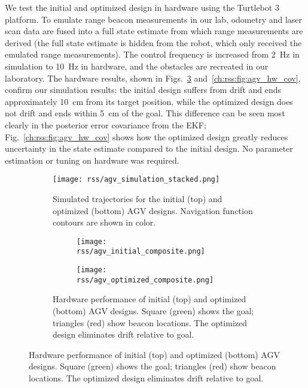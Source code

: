 We test the initial and optimized design in hardware using the Turtlebot 3 platform. To emulate range beacon measurements in our lab, odometry and laser scan data are fused into a full state estimate from which range measurements are derived (the full state estimate is hidden from the robot, which only received the emulated range measurements). The control frequency is increased from \SI{2}{Hz} in simulation to \SI{10}{Hz} in hardware, and the obstacles are recreated in our laboratory. The hardware results, shown in Figs.~\ref{ch:rss:fig:agv_hw} and~\ref{ch:rss:fig:agv_hw_cov}, confirm our simulation results: the initial design suffers from drift and ends approximately \SI{10}{cm} from its target position, while the optimized design does not drift and ends within \SI{5}{cm} of the goal. This difference can be seen most clearly in the posterior error covariance from the EKF;  Fig.~\ref{ch:rss:fig:agv_hw_cov} shows how the optimized design greatly reduces uncertainty in the state estimate compared to the initial design. No parameter estimation or tuning on hardware was required.

\begin{figure}[tb]
    \centering
    \begin{subfigure}[c]{0.45\linewidth}
        \centering
        \texttt{[image: rss/agv\_simulation\_stacked.png]}
        \caption{Simulated trajectories for the initial (top) and optimized (bottom) AGV designs. Navigation function contours are shown in color.}
        \label{ch:rss:fig:agv_representative_trajectories}
    \end{subfigure}
    \quad
    \begin{subfigure}[c]{0.45\linewidth}
        \begin{subfigure}[t]{\linewidth}
            \centering
            \texttt{[image: rss/agv\_initial\_composite.png]}
        \end{subfigure}

        \begin{subfigure}[t]{\linewidth}
            \centering
            \texttt{[image: rss/agv\_optimized\_composite.png]}
        \end{subfigure}
        \caption{Hardware performance of initial (top) and optimized (bottom) AGV designs. Square (green) shows the goal; triangles (red) show beacon locations. The optimized design eliminates drift relative to goal.}
        \label{ch:rss:fig:agv_hw}
    \end{subfigure}
\end{figure}


